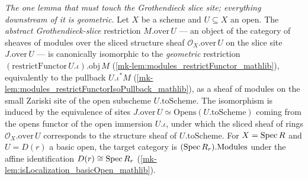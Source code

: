 \begin{lemma}\label{mk-lem:over_restrict_iso}
  \leanok

  \textit{The one lemma that must touch the Grothendieck slice site; everything downstream of it is
  geometric.}
  Let \(X\) be a scheme and \(U \subseteq X\) an open. The \emph{abstract Grothendieck-slice}
  restriction \(M.\mathrm{over}\,U\) — an object of the category of sheaves of modules over the
  sliced structure sheaf \(\mathcal{O}_X.\mathrm{over}\,U\) on the slice site \(J.\mathrm{over}\,U\) —
  is canonically isomorphic to the \emph{geometric} restriction
  \((\mathrm{restrictFunctor}\,U.\iota).\mathrm{obj}\,M\)
  (\ref{mk-lem:modules_restrictFunctor_mathlib}), equivalently to the pullback \(U.\iota^{*} M\)
  (\ref{mk-lem:modules_restrictFunctorIsoPullback_mathlib}), as a sheaf of modules on the small Zariski
  site of the open subscheme \(U.\mathrm{toScheme}\). The isomorphism is induced by the equivalence
  of sites \(J.\mathrm{over}\,U \simeq \mathrm{Opens}(U.\mathrm{toScheme})\) coming from the opens
  functor of the open immersion \(U.\iota\), under which the sliced sheaf of rings
  \(\mathcal{O}_X.\mathrm{over}\,U\) corresponds to the structure sheaf of \(U.\mathrm{toScheme}\).
  For \(X = \operatorname{Spec} R\) and \(U = D(r)\) a basic open, the target category is
  \((\operatorname{Spec} R_r).\mathrm{Modules}\) under the affine identification \(D(r) \cong \operatorname{Spec} R_r\)
  (\ref{mk-lem:isLocalization_basicOpen_mathlib}).
\end{lemma}
